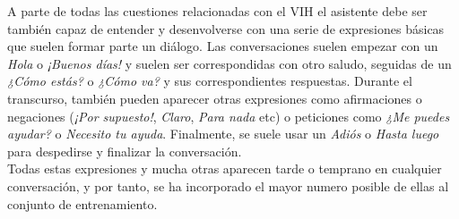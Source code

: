 A parte de todas las cuestiones relacionadas con el VIH el asistente debe ser también capaz de entender y desenvolverse con una serie de expresiones básicas que suelen formar parte un diálogo. Las conversaciones suelen empezar con un \textit{Hola} o \textit{¡Buenos días!} y suelen ser correspondidas con otro saludo, seguidas de un \textit{¿Cómo estás?} o \textit{¿Cómo va?} y sus correspondientes respuestas. Durante el transcurso, también pueden aparecer otras expresiones como afirmaciones o negaciones (\textit{¡Por supuesto!}, \textit{Claro}, \textit{Para nada} etc) o peticiones como \textit{¿Me puedes ayudar?} o \textit{Necesito tu ayuda}. Finalmente, se suele usar un \textit{Adiós} o \textit{Hasta luego} para despedirse y finalizar la conversación.\\


Todas estas expresiones y mucha otras aparecen tarde o temprano en cualquier conversación, y por tanto, se ha incorporado el mayor numero posible de ellas al conjunto de entrenamiento.\\


